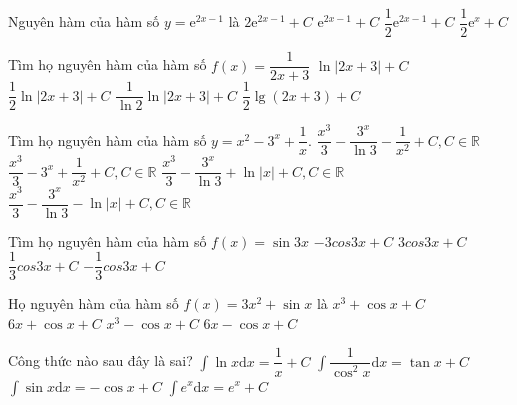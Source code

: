 \begin{ex}
	Nguyên hàm của hàm số $ y=\mathrm{e}^{2x-1}$ là
	\choice
	{${2}{{\mathrm{e}}^{2x-1}}+C$}
	{${\mathrm{e}}^{2x-1}+C$}
	{\True $\dfrac{1}{2}{{\mathrm{e}}^{2x-1}}+C$}
	{$\dfrac{1}{2}{{\mathrm{e}}^x}+C$}
\end{ex}
\begin{ex}
	Tìm họ nguyên hàm của hàm số $ f(x)=\dfrac{1}{2x+3}$
	\choice
	{$\ln\left| 2x+3\right|+C$}
	{\True $\dfrac{1}{2}\ln\left| 2x+3\right|+C$}
	{$\dfrac{1}{\ln 2}\ln\left| 2x+3\right|+C$}
	{$\dfrac{1}{2}\lg\left(2x+3\right)+C$}
	\loigiai{}
\end{ex}
\begin{ex}
	Tìm họ nguyên hàm của hàm số $ y=x^2-3^x+\dfrac{1}{x}$.
	\choice
	{$\dfrac{x^3}{3}-\dfrac{3^x}{\ln 3}-\dfrac{1}{x^2}+C,C\in\mathbb{R}$}
	{$\dfrac{x^3}{3}-3^x+\dfrac{1}{x^2}+C,C\in\mathbb{R}$}
	{\True $\dfrac{x^3}{3}-\dfrac{3^x}{\ln 3}+\ln\left|x\right|+C,C\in\mathbb{R}$}
	{$\dfrac{x^3}{3}-\dfrac{3^x}{\ln 3}-\ln\left|x\right|+C,C\in\mathbb{R}$}
\end{ex}
\begin{ex}
	Tìm họ nguyên hàm của hàm số $ f(x)=\sin 3x$
	\choice
	{$-3{cos}3x+C$}
	{${3cos}3x+C$}
	{$\dfrac{1}{3}{cos}3x+C$}
	{\True $-\dfrac{1}{3}{cos}3x+C$}
\end{ex}
\begin{ex}
	Họ nguyên hàm của hàm số $f(x)=3x^2+\sin x$ là
	\choice
	{$x^3+\cos x+C$}
	{$6x+\cos x+C$}
	{\True $x^3-\cos x+C$}
	{$6x-\cos x+C$}
\end{ex}
\begin{ex}
	Công thức nào sau đây là sai?
	\choice
	{\True $\displaystyle\int{\ln x}\mathrm{d}x=\dfrac{1}{x}+C$}
	{$\displaystyle\int{\dfrac{1}{\cos^2x}}\mathrm{d}x=\tan x+C$}
	{$\displaystyle\int{\sin x}\mathrm{d}x=-\cos x+C$}
	{$\displaystyle\int{{e}^x}\mathrm{d}x={e}^x+C$}
\end{ex}
